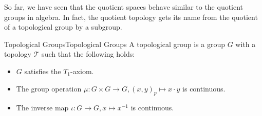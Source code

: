 \documentclass[../main.tex]{subfiles}
\begin{document}
So far, we have seen that the quotient spaces behave similar to the quotient groups in algebra. In fact, the quotient topology gets its name from the quotient of a topological group by a subgroup.

\begin{definition}{Topological Groups}{Topological Groups}
	A topological group is a group $G$ with a topology $\mathcal{T}$ such that the following holds:
	\begin{itemize}
	\item $G$ satisfies the $T_1$-axiom.
	\item The group operation $\mu : G \times G \rightarrow G, (x,y)_p \mapsto x \cdot y$ is continuous.
	\item The inverse map $\iota : G \rightarrow G, x \mapsto x^{-1}$ is continuous.
	\end{itemize}
\end{definition}
\end{document}
